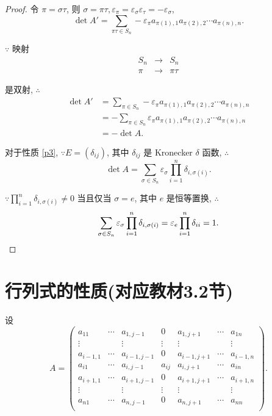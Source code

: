 \documentclass[color=black,device=normal,lang=cn,mode=geye]{elegantnote}
\begin{document}
\begin{proof}
    令 $\pi=\sigma\tau$, 则 $\sigma=\pi\tau,\varepsilon_\pi=\varepsilon_\sigma\varepsilon_\tau=-\varepsilon_\sigma$,
    \[\det A'=\sum\limits_{\pi\tau\in S_n}-\varepsilon_\pi a_{\pi(1),1}a_{\pi(2),2}\cdots a_{\pi(n),n}.\]

    $\because$ 映射
    \[\begin{array}{rcl}
        S_n & \to & S_n \\
        \pi & \to & \pi\tau
    \end{array}\]

    是双射, $\therefore$
    \begin{align*}
        \det A' & =\sum\limits_{\pi\in S_n}-\varepsilon_\pi a_{\pi(1),1}a_{\pi(2),2}\cdots a_{\pi(n),n} \\
        & =-\sum\limits_{\pi\in S_n}\varepsilon_\pi a_{\pi(1),1}a_{\pi(2),2}\cdots a_{\pi(n),n} \\
        & =-\det A.
    \end{align*}

    对于性质 \ref{p3}, $\because E=(\delta_{ij})$, 其中 $\delta_{ij}$ 是 Kronecker $\delta$ 函数, $\therefore$
    \[\det A=\sum\limits_{\sigma\in S_n}\varepsilon_\sigma\prod\limits_{i=1}^n\delta_{i,\sigma(i)}.\]

    $\because\prod\limits_{i=1}^n\delta_{i,\sigma(i)}\neq0$ 当且仅当 $\sigma=e$, 其中 $e$ 是恒等置换, $\therefore$
    \[\sum\limits_{\sigma\in S_n}\varepsilon_\sigma\prod\limits_{i=1}^n\delta_{i,\sigma(i)}=\varepsilon_e\prod\limits_{i=1}^n\delta_{ii}=1.\qedhere\]
\end{proof}
\section{行列式的性质(对应教材3.2节)}
设
\[A=\begin{pmatrix}
    a_{11} & \cdots & a_{1,j-1} & 0 & a_{1,j+1} & \cdots & a_{1n} \\
    \vdots && \vdots & \vdots & \vdots && \vdots \\
    a_{i-1,1} & \cdots & a_{i-1,j-1} & 0 & a_{i-1,j+1} & \cdots & a_{i-1,n} \\
    a_{i1} & \cdots & a_{i,j-1} & a_{ij} & a_{i,j+1} & \cdots & a_{in} \\
    a_{i+1,1} & \cdots & a_{i+1,j-1} & 0 & a_{i+1,j+1} & \cdots & a_{i+1,n} \\
    \vdots && \vdots & \vdots & \vdots && \vdots \\
    a_{n1} & \cdots & a_{n,j-1} & 0 & a_{n,j+1} & \cdots & a_{nn} \\
\end{pmatrix}.\]
\end{document}
